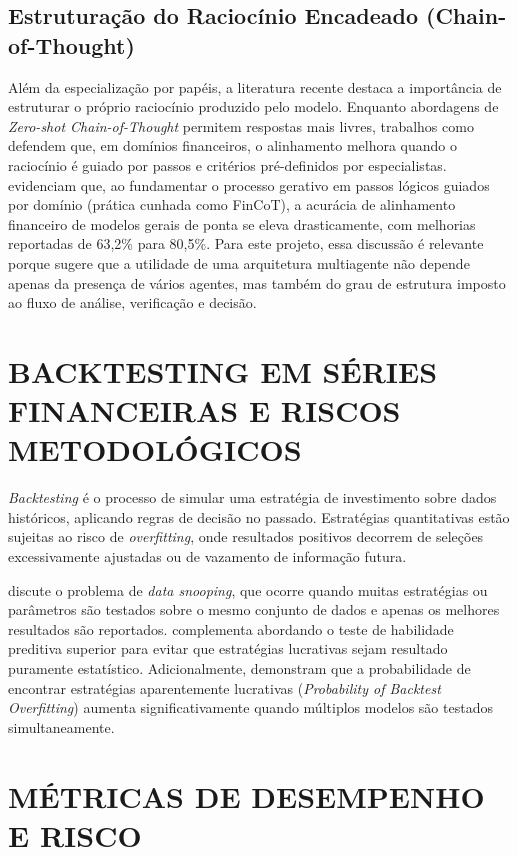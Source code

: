 \documentclass{eic-bcc-tcc}
\begin{document}
\subsection{Estruturação do Raciocínio Encadeado (Chain-of-Thought)}

Além da especialização por papéis, a literatura recente destaca a importância de estruturar o próprio raciocínio produzido pelo modelo. Enquanto abordagens de \textit{Zero-shot Chain-of-Thought} permitem respostas mais livres, trabalhos como \citet{FinCoT2025} defendem que, em domínios financeiros, o alinhamento melhora quando o raciocínio é guiado por passos e critérios pré-definidos por especialistas. \citet[p. 1]{FinCoT2025} evidenciam que, ao fundamentar o processo gerativo em passos lógicos guiados por domínio (prática cunhada como FinCoT), a acurácia de alinhamento financeiro de modelos gerais de ponta se eleva drasticamente, com melhorias reportadas de 63,2\% para 80,5\%. Para este projeto, essa discussão é relevante porque sugere que a utilidade de uma arquitetura multiagente não depende apenas da presença de vários agentes, mas também do grau de estrutura imposto ao fluxo de análise, verificação e decisão.

\section{BACKTESTING EM SÉRIES FINANCEIRAS E RISCOS METODOLÓGICOS}

\textit{Backtesting} é o processo de simular uma estratégia de investimento sobre dados históricos, aplicando regras de decisão no passado. Estratégias quantitativas estão sujeitas ao risco de \textit{overfitting}, onde resultados positivos decorrem de seleções excessivamente ajustadas ou de vazamento de informação futura.

\citet{White2000} discute o problema de \textit{data snooping}, que ocorre quando muitas estratégias ou parâmetros são testados sobre o mesmo conjunto de dados e apenas os melhores resultados são reportados. \citet{Hansen2005} complementa abordando o teste de habilidade preditiva superior para evitar que estratégias lucrativas sejam resultado puramente estatístico. Adicionalmente, \citet{Bailey2017} demonstram que a probabilidade de encontrar estratégias aparentemente lucrativas (\textit{Probability of Backtest Overfitting}) aumenta significativamente quando múltiplos modelos são testados simultaneamente.

\section{MÉTRICAS DE DESEMPENHO E RISCO}
\end{document}
